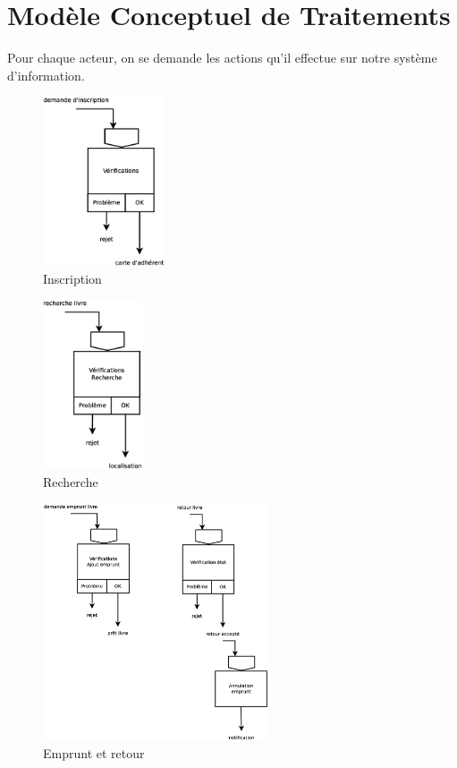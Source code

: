\newpage
\section*{Modèle Conceptuel de Traitements}

Pour chaque acteur, on se demande les actions qu'il effectue sur notre système d'information.

\begin{figure}[!htb]
    \begin{center}
    \includegraphics[height=5cm]{images/cc1_mct1.eps}
    \caption{\label{cc1_mct1} Inscription}
    \end{center}
\end{figure}

\begin{figure}[!htb]
    \begin{center}
    \includegraphics[height=5cm]{images/cc1_mct2.eps}
    \caption{\label{cc1_mct2} Recherche}
    \end{center}
\end{figure}

\begin{figure}[!htb]
    \begin{center}
    \includegraphics[height=7cm]{images/cc1_mct3.eps}
    \caption{\label{cc1_mct3} Emprunt et retour}
    \end{center}
\end{figure}


